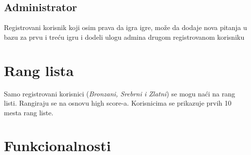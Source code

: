 \documentclass{article}
\begin{document}
\subsection{Administrator}
Registrovani korisnik koji osim prava da igra igre, može da dodaje nova pitanja u bazu za 
prvu i treću igru i dodeli ulogu admina drugom registrovanom korisniku
\section{Rang lista}
Samo registrovani korisnici (\textit{Bronzani, Srebrni i Zlatni}) se mogu naći na rang listi. Rangiraju se na osnovu 
high score-a. Korisnicima se prikazuje prvih 10 mesta rang liste.
\newpage
\section{Funkcionalnosti}
\end{document}
